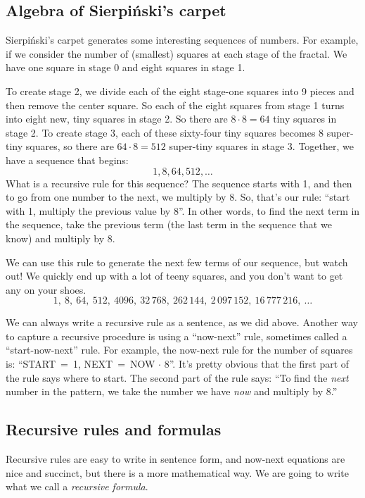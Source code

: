 \subsection{Algebra of {S}ierpi\'nski's carpet}

Sierpi\'nski's carpet generates some interesting sequences of numbers. For example, if we consider the number of (smallest) squares at each stage of the fractal. We have one square in stage 0 and eight squares in stage 1.

To create stage 2, we divide each of the eight stage-one squares into 9 pieces and then remove the center square. So each of the eight squares from stage 1 turns into eight new, tiny squares in stage 2. So there are $8\cdot8 = 64$ tiny squares in stage 2. To create stage 3, each of these sixty-four tiny squares becomes 8 super-tiny squares, so there are $64 \cdot 8 = 512$ super-tiny squares in stage 3. Together, we have a sequence that begins:
\[1, 8, 64, 512, \dotsc\]
What is a recursive rule for this sequence? The sequence starts with 1, and then to go from one number to the next, we multiply by 8. So, that's our rule: ``start with 1, multiply the previous value by 8''. In other words, to find the next term in the sequence, take the previous term (the last term in the sequence that we know) and multiply by 8.

We can use this rule to generate the next few terms of our sequence, but watch out! We quickly end up with a lot of teeny squares, and you don't want to get any on your shoes. \[1,~ 8,~ 64,~ 512,~ 4096,~ 32\,768,~ 262\,144,~ 2\,097\,152,~ 16\,777\,216,~ \dotsc\]

We can always write a recursive rule as a sentence, as we did above. Another way to capture a recursive procedure is using a ``now-next'' rule, sometimes called a ``start-now-next'' rule. For example, the now-next rule for the number of squares is: ``START~=~1, NEXT~=~NOW $\cdot$ 8''. It's pretty obvious that the first part of the rule says where to start. The second part of the rule says: ``To find the \textit{next} number in the pattern, we take the number we have \textit{now} and multiply by 8.''

\subsection{Recursive rules and formulas}

Recursive rules are easy to write in sentence form, and now-next equations are nice and succinct, but there is a more mathematical way. We are going to write what we call a \textit{recursive formula}.
 
